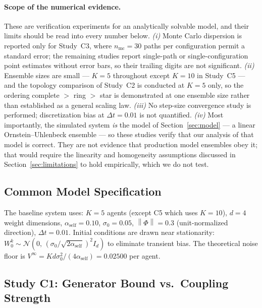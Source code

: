 \documentclass[12pt]{article}
\theoremstyle{plain}
\theoremstyle{definition}
\newcommand{\norm}[1]{\left\lVert #1 \right\rVert}
\begin{document}
\paragraph{Scope of the numerical evidence.}
These are verification experiments for an analytically solvable model, and their limits should be
read into every number below. \emph{(i)} Monte Carlo dispersion is reported only for Study~C3, where
$n_{\mathrm{mc}} = 30$ paths per configuration permit a standard error; the remaining studies report
single-path or single-configuration point estimates without error bars, so their trailing digits are
not significant. \emph{(ii)} Ensemble sizes are small --- $K = 5$ throughout except $K = 10$ in
Study~C5 --- and the topology comparison of Study~C2 is conducted at $K = 5$ only, so the ordering
complete $>$ ring $>$ star is demonstrated at one ensemble size rather than established as a general
scaling law. \emph{(iii)} No step-size convergence study is performed; discretization bias at
$\Delta t = 0.01$ is not quantified. \emph{(iv)} Most importantly, the simulated system \emph{is} the
model of Section~\ref{sec:model} --- a linear Ornstein--Uhlenbeck ensemble --- so these studies
verify that our analysis of that model is correct. They are not evidence that production model
ensembles obey it; that would require the linearity and homogeneity assumptions discussed in
Section~\ref{sec:limitations} to hold empirically, which we do not test.

\subsection{Common Model Specification}

The baseline system uses:
$K = 5$ agents (except C5 which uses $K = 10$),
$d = 4$ weight dimensions,
$\alpha_{\mathrm{self}} = 0.10$,
$\sigma_0 = 0.05$,
$\norm{\Phi} = 0.3$ (unit-normalized direction),
$\Delta t = 0.01$.
Initial conditions are drawn near stationarity:
$W^k_0 \sim \mathcal{N}(0,\, (\sigma_0/\sqrt{2\alpha_{\mathrm{self}}})^2 I_d)$
to eliminate transient bias.  The theoretical noise floor is
$V^\infty = Kd\sigma_0^2/(4\alpha_{\mathrm{self}}) = 0.02500$ per agent.

\subsection{Study C1: Generator Bound vs.\ Coupling Strength}
\end{document}

